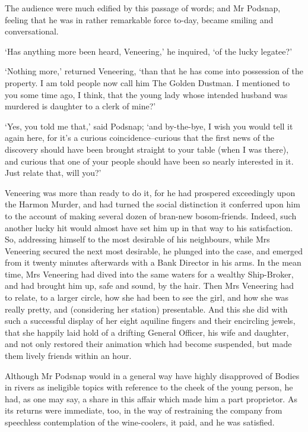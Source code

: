 The audience were much edified by this passage of words; and Mr Podsnap,
feeling that he was in rather remarkable force to-day, became smiling
and conversational.

‘Has anything more been heard, Veneering,’ he inquired, ‘of the lucky
legatee?’

‘Nothing more,’ returned Veneering, ‘than that he has come into
possession of the property. I am told people now call him The Golden
Dustman. I mentioned to you some time ago, I think, that the young lady
whose intended husband was murdered is daughter to a clerk of mine?’

‘Yes, you told me that,’ said Podsnap; ‘and by-the-bye, I wish you would
tell it again here, for it’s a curious coincidence--curious that the
first news of the discovery should have been brought straight to your
table (when I was there), and curious that one of your people should
have been so nearly interested in it. Just relate that, will you?’

Veneering was more than ready to do it, for he had prospered exceedingly
upon the Harmon Murder, and had turned the social distinction it
conferred upon him to the account of making several dozen of bran-new
bosom-friends. Indeed, such another lucky hit would almost have set him
up in that way to his satisfaction. So, addressing himself to the most
desirable of his neighbours, while Mrs Veneering secured the next most
desirable, he plunged into the case, and emerged from it twenty minutes
afterwards with a Bank Director in his arms. In the mean time, Mrs
Veneering had dived into the same waters for a wealthy Ship-Broker, and
had brought him up, safe and sound, by the hair. Then Mrs Veneering had
to relate, to a larger circle, how she had been to see the girl, and how
she was really pretty, and (considering her station) presentable.
And this she did with such a successful display of her eight aquiline
fingers and their encircling jewels, that she happily laid hold of a
drifting General Officer, his wife and daughter, and not only restored
their animation which had become suspended, but made them lively friends
within an hour.

Although Mr Podsnap would in a general way have highly disapproved of
Bodies in rivers as ineligible topics with reference to the cheek of the
young person, he had, as one may say, a share in this affair which made
him a part proprietor. As its returns were immediate, too, in the way
of restraining the company from speechless contemplation of the
wine-coolers, it paid, and he was satisfied.

